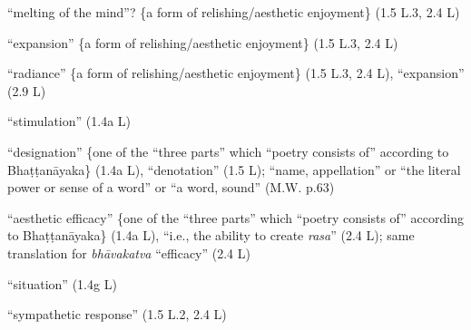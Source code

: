 \documentclass[10pt]{article}
\begin{document}
\begin{multicols}{2}
\begin{enumerate}[
			leftmargin=0em,
			rightmargin=0em,
		]
		 ``melting of the mind''? \{a form of relishing/aesthetic enjoyment\} (1.5 L.3, 2.4 L)

		 ``expansion'' \{a form of relishing/aesthetic enjoyment\} (1.5 L.3, 2.4 L)

		 ``radiance'' \{a form of relishing/aesthetic enjoyment\} (1.5 L.3, 2.4 L),
		``expansion'' (2.9 L)






		 ``stimulation'' (1.4a L)

		 ``designation'' \{one of the ``three parts'' which ``poetry consists of'' according to Bhaṭṭanāyaka\} (1.4a L),
		``denotation'' (1.5 L);
		``name, appellation'' or
		``the literal power or sense of a word'' or
		``a word, sound'' (M.W. p.63)

		 ``aesthetic efficacy'' \{one of the ``three parts'' which ``poetry consists of'' according to Bhaṭṭanāyaka\} (1.4a L),
		``i.e., the ability to create \textit{rasa}'' (2.4 L);
		same translation for \textit{bhāvakatva} ``efficacy'' (2.4 L) %

		 ``situation'' (1.4g L)



		 ``sympathetic response'' (1.5 L.2, 2.4 L)



\end{enumerate}
\end{multicols}
\end{document}
